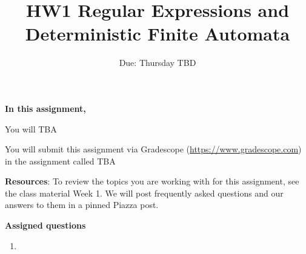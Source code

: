 

\title{HW1 Regular Expressions and Deterministic Finite Automata}
\date{Due: Thursday TBD}


\maketitle
\thispagestyle{fancy}


{\bf In this assignment,}

You will TBA

\instructions

You will submit this assignment via Gradescope
(\href{https://www.gradescope.com}{https://www.gradescope.com}) 
in the assignment called TBA

{\bf Resources}: To review the topics you are working with 
for this assignment, see the class material Week 1.
We will post frequently asked questions and our answers to them in a 
pinned Piazza post.

{\bf Assigned questions}

\begin{enumerate}
\item 
\end{enumerate}

